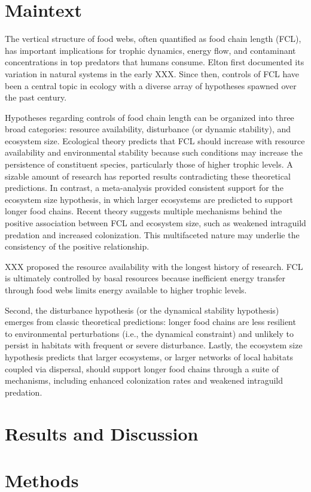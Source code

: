 \documentclass[11pt, class=article, crop=false]{standalone}
\begin{document}
\section{Maintext}

The vertical structure of food webs, often quantified as food chain length (FCL), has important implications for trophic dynamics, energy flow, and contaminant concentrations in top predators that humans consume.
Elton first documented its variation in natural systems in the early XXX.
Since then, controls of FCL have been a central topic in ecology with a diverse array of hypotheses spawned over the past century.

Hypotheses regarding controls of food chain length can be organized into three broad categories: resource availability, disturbance (or dynamic stability), and ecosystem size.
Ecological theory predicts that FCL should increase with resource availability and environmental stability because such conditions may increase the persistence of constituent species, particularly those of higher trophic levels.
A sizable amount of research has reported results contradicting these theoretical predictions.
In contrast, a meta-analysis provided consistent support for the ecosystem size hypothesis, in which larger ecosystems are predicted to support longer food chains.
Recent theory suggests multiple mechanisms behind the positive association between FCL and ecosystem size, such as weakened intraguild predation and increased colonization.
This multifaceted nature may underlie the consistency of the positive relationship.

XXX proposed the resource availability with the longest history of research.
FCL is ultimately controlled by basal resources because inefficient energy transfer through food webs limits energy available to higher trophic levels.


Second, the disturbance hypothesis (or the dynamical stability hypothesis) emerges from classic theoretical predictions: longer food chains are less resilient to environmental perturbations (i.e., the dynamical constraint) and unlikely to persist in habitats with frequent or severe disturbance.
Lastly, the ecosystem size hypothesis predicts that larger ecosystems, or larger networks of local habitats coupled via dispersal, should support longer food chains through a suite of mechanisms, including enhanced colonization rates and weakened intraguild predation.

\section{Results and Discussion}
\section{Methods}
\end{document}
